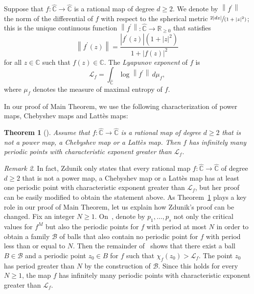 \documentclass[JEP,XML,SOM,Unicode,published]{cedram}
\newcommand{\spfrac}[2]{\sfrac{#1}{(#2)}}
\theoremstyle{plain}
\newtheorem{theorem}{Theorem}
\theoremstyle{definition}
\theoremstyle{remark}
\newtheorem{remark}[theorem]{Remark}
\begin{document}
Suppose that $f \colon \widehat{\mathbb{C}} \to \widehat{\mathbb{C}}$ is a rational map of degree $d \geq 2$. We denote by $\left\lVert f^{\prime} \right\rVert$ the norm of the differential of $f$ with respect to the spherical metric $\spfrac{2 \lvert dz \rvert}{1 +\lvert z \rvert^{2}}$; this is the unique continuous function $\left\lVert f^{\prime} \right\rVert \colon \widehat{\mathbb{C}} \to \mathbb{R}_{\geq 0}$ that satisfies
\[
\left\lVert f^{\prime}(z) \right\rVert = \frac{\left\lvert f^{\prime}(z) \right\rvert \left(1 +\lvert z \rvert^{2} \right)}{1 +\left\lvert f(z) \right\rvert^{2}}
\]
for all $z \in \mathbb{C}$ such that $f(z) \in \mathbb{C}$. The \emph{Lyapunov exponent} of $f$ is
\[
\mathcal{L}_{f} = \int_{\widehat{\mathbb{C}}} \log\left\lVert f^{\prime} \right\rVert \, d\mu_{f},
\]
where $\mu_{f}$ denotes the measure of maximal entropy of $f$.

In our proof of Main Theorem, we use the following characterization of power maps, Chebyshev maps and Lattès maps:

\begin{theorem}[{\cite[Prop.\,4]{Z2014}}]
\label{theorem:exceptional}
Assume that $f \colon \widehat{\mathbb{C}} \to \widehat{\mathbb{C}}$ is a rational map of degree $d \geq 2$ that is not a power map, a Chebyshev map or a Lattès map. Then $f$ has infinitely many periodic points with characteristic exponent greater than $\mathcal{L}_{f}$.
\end{theorem}

\begin{remark}
In fact, Zdunik only states that every rational map $f \colon \widehat{\mathbb{C}} \to \widehat{\mathbb{C}}$ of degree $d \geq 2$ that is not a power map, a Chebyshev map or a Lattès map has at least one periodic point with characteristic exponent greater than $\mathcal{L}_{f}$, but her proof can be easily modified to obtain the statement above. As Theorem~\ref{theorem:exceptional} plays a key role in our proof of Main Theorem, let us explain how Zdunik's proof can be changed. Fix an integer $N \geq 1$. On~\cite[p.\,260]{Z2014}, denote by $p_{1}, \dotsc, p_{s}$ not only the critical values for $f^{M}$ but also the periodic points for $f$ with period at most $N$ in order to obtain a family $\mathcal{B}$ of balls that also contain no periodic point for $f$ with period less than or equal to $N$. Then the remainder of~\cite[Proof of Prop.\,4]{Z2014} shows that there exist a ball $B \in \mathcal{B}$ and a periodic point $z_{0} \in B$ for $f$ such that $\chi_{f}(z_{0}) > \mathcal{L}_{f}$. The point $z_{0}$ has period greater than $N$ by the construction of $\mathcal{B}$. Since this holds for every $N \geq 1$, the map $f$ has infinitely many periodic points with characteristic exponent greater than $\mathcal{L}_{f}$.
\end{remark}
\end{document}
